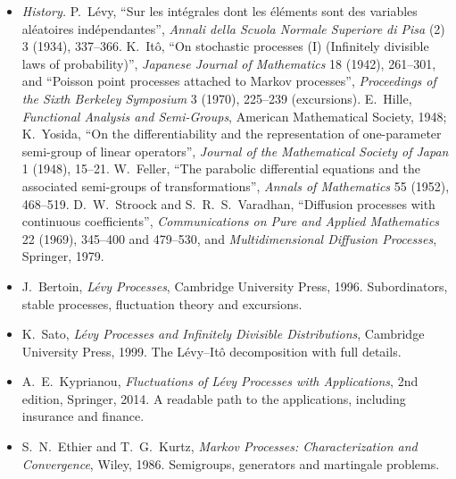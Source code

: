 \begin{itemize}
\item \emph{History.} P.~L\'evy, ``Sur les int\'egrales dont les \'el\'ements sont des variables al\'eatoires ind\'ependantes'', \emph{Annali della Scuola Normale Superiore di Pisa} (2) 3 (1934), 337--366. K.~It\^o, ``On stochastic
processes (I) (Infinitely divisible laws of probability)'', \emph{Japanese Journal of Mathematics} 18 (1942), 261--301, and ``Poisson point processes attached to Markov processes'', \emph{Proceedings of the Sixth Berkeley
Symposium} 3 (1970), 225--239 (excursions). E.~Hille, \emph{Functional Analysis and Semi-Groups}, American Mathematical Society, 1948; K.~Yosida,
``On the differentiability and the representation of one-parameter semi-group of linear operators'', \emph{Journal of the Mathematical Society of Japan} 1 (1948), 15--21. W.~Feller, ``The parabolic differential equations
and the associated semi-groups of transformations'', \emph{Annals of Mathematics} 55 (1952), 468--519. D.~W.~Stroock and S.~R.~S.~Varadhan, ``Diffusion processes with continuous coefficients'', \emph{Communications on Pure
and Applied Mathematics} 22 (1969), 345--400 and 479--530, and \emph{Multidimensional Diffusion Processes}, Springer, 1979.
\item J.~Bertoin, \emph{L\'evy Processes}, Cambridge University Press, 1996. Subordinators, stable processes, fluctuation theory and excursions.
\item K.~Sato, \emph{L\'evy Processes and Infinitely Divisible Distributions}, Cambridge University Press, 1999. The L\'evy--It\^o decomposition with full details.
\item A.~E.~Kyprianou, \emph{Fluctuations of L\'evy Processes with Applications}, 2nd edition, Springer, 2014. A readable path to the applications, including insurance and finance.
\item S.~N.~Ethier and T.~G.~Kurtz, \emph{Markov Processes: Characterization and Convergence}, Wiley, 1986. Semigroups, generators and martingale problems.
\end{itemize}
